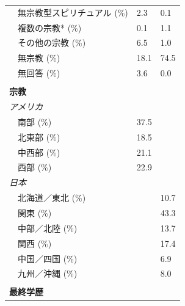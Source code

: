 \documentclass[a4j,12pt]{jreport}
\begin{document}
\begin{table}[h]
{\begin{threeparttable}
\begin{tabular}{@{}lll@{}}
~~無宗教型スピリチュアル (\%)                       & 2.3           & 0.1              \\
~~複数の宗教* (\%)                                     & 0.1           & 1.1              \\
~~その他の宗教 (\%)                                   & 6.5           & 1.0              \\
~~無宗教 (\%)                                       & 18.1          & 74.5             \\
~~無回答   (\%)                                             & 3.6           & 0.0              \\
\\ \textbf{宗教}                                                               &               &                  \\
\textsl{アメリカ}                                                                   &               &                  \\
~~南部 (\%)                                               & 37.5          &                  \\
~~北東部 (\%)                                           & 18.5          &                  \\
~~中西部 (\%)                                             & 21.1          &                  \\
~~西部 (\%)                                                & 22.9          &                  \\
\textsl{日本}                                                             &               &                  \\
~~北海道／東北   (\%)                                   &               & 10.7             \\
~~関東 (\%)                                               &               & 43.3             \\
~~中部／北陸   (\%)                                    &               & 13.7             \\
~~関西   (\%)                                               &               & 17.4             \\
~~中国／四国  (\%)                                    &               & 6.9              \\
~~九州／沖縄 (\%)                                           &               & 8.0              \\ 
\\ \textbf{最終学歴}                                                  &               &                  \\

\end{tabular}
\end{threeparttable}}
\end{table}
\end{document}
